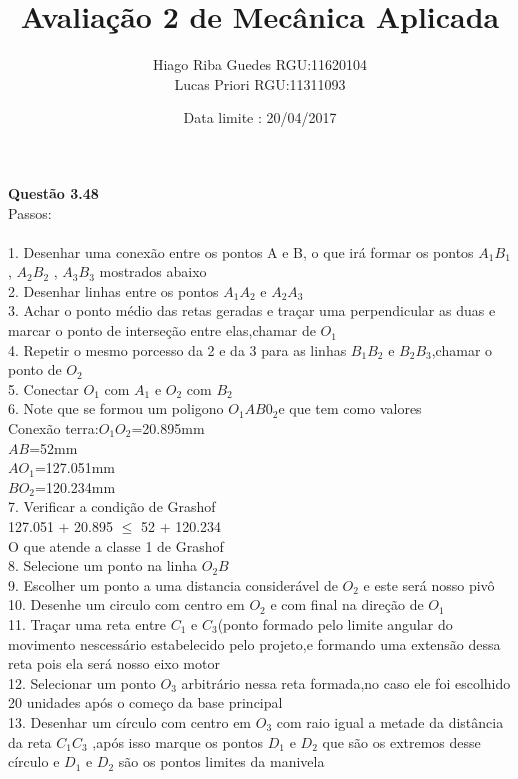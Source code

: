 \documentclass[11pt,a4paper]{article}
\title{Avalia\c{c}\~ao 2 de Mec\^anica Aplicada}
\author{Hiago Riba Guedes RGU:11620104\\ Lucas Priori RGU:11311093}
\date{Data limite : 20/04/2017}
\begin{document}
\maketitle

\textbf{Quest\~ao 3.48}\\
Passos:\\
\\
1. Desenhar uma conex\~ao entre os pontos A e B, o que ir\'a formar os pontos $A_1B_1$ , $A_2B_2$ , $A_3B_3$ mostrados abaixo  \\
2. Desenhar linhas entre os pontos $A_1A_2$ e $A_2A_3$\\
3. Achar o ponto m\'edio das retas geradas e tra\c{c}ar uma perpendicular as duas e marcar o ponto de interse\c{c}\~ao entre elas,chamar de $O_1$ \\
4. Repetir o mesmo porcesso da 2 e da 3 para as linhas $B_1B_2$ e $B_2B_3$,chamar o ponto de $O_2$\\
5. Conectar $O_1$ com $A_1$ e $O_2$ com $B_2$\\
6. Note que se formou um poligono $O_1AB0_2$e que tem como valores \\
Conex\~ao terra:$O_1O_2$=20.895mm \\
$AB$=52mm \\
$AO_1$=127.051mm\\
$BO_2$=120.234mm\\
7. Verificar a condi\c{c}\~ao de Grashof \\
127.051 + 20.895 $\leq$ 52 + 120.234\\
O que atende a classe 1 de Grashof \\
8. Selecione um ponto na linha $O_2B$ \\
9. Escolher um ponto a uma distancia consider\'avel de $O_2$ e este ser\'a nosso piv\^o \\
10. Desenhe um circulo com centro em $O_2$ e com final na dire\c{c}\~ao de $O_1$ \\
11. Tra\c{c}ar uma reta entre $C_1$ e $C_3$(ponto formado pelo limite angular do movimento nescess\'ario estabelecido pelo projeto,e formando uma extens\~ao dessa reta pois ela ser\'a nosso eixo motor\\
12. Selecionar um ponto $O_3$ arbitr\'ario nessa reta formada,no caso ele foi escolhido 20 unidades ap\'os o come\c{c}o da base principal\\
13. Desenhar um c\'irculo com centro em $O_3$ com raio igual a metade da dist\^ancia da reta $C_1C_3$ ,ap\'os isso marque os pontos $D_1$ e $D_2$ que s\~ao os extremos desse c\'irculo e $D_1$ e $D_2$ s\~ao os pontos  limites da manivela \\
\end{document}
